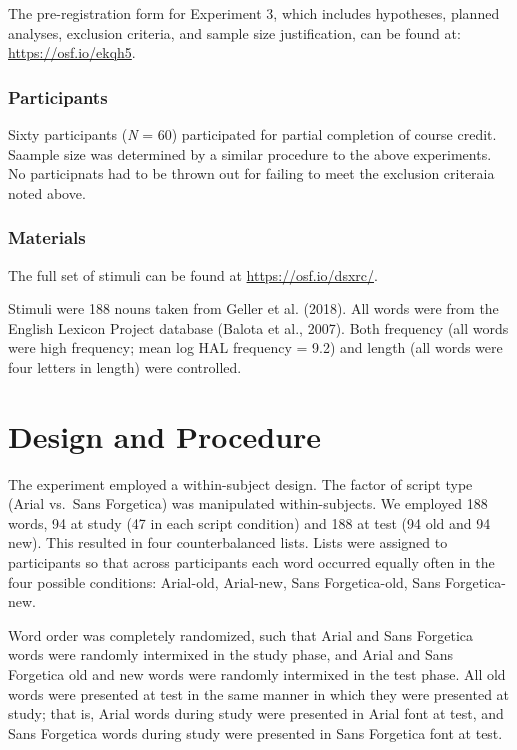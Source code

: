 \documentclass[english,doc]{apa6}
\begin{document}
The pre-registration form for Experiment 3, which includes hypotheses, planned analyses, exclusion criteria, and sample size justification, can be found at: \url{https://osf.io/ekqh5}.

\hypertarget{participants-2}{%
\subsubsection{Participants}\label{participants-2}}

Sixty participants (\emph{N} = 60) participated for partial completion of course credit. Saample size was determined by a similar procedure to the above experiments. No participnats had to be thrown out for failing to meet the exclusion criteraia noted above.

\hypertarget{materials-2}{%
\subsubsection{Materials}\label{materials-2}}

The full set of stimuli can be found at \url{https://osf.io/dsxrc/}.

Stimuli were 188 nouns taken from Geller et al. (2018). All words were from the English Lexicon Project database (Balota et al., 2007). Both frequency (all words were high frequency; mean log HAL frequency = 9.2) and length (all words were four letters in length) were controlled.

\hypertarget{design-and-procedure-2}{%
\section{Design and Procedure}\label{design-and-procedure-2}}

The experiment employed a within-subject design. The factor of script type (Arial vs.~Sans Forgetica) was manipulated within-subjects. We employed 188 words, 94 at study (47 in each script condition) and 188 at test (94 old and 94 new). This resulted in four counterbalanced lists. Lists were assigned to participants so that across participants each word occurred equally often in the four possible conditions: Arial-old, Arial-new, Sans Forgetica-old, Sans Forgetica-new.

Word order was completely randomized, such that Arial and Sans Forgetica words were randomly intermixed in the study phase, and Arial and
Sans Forgetica old and new words were randomly intermixed in the test phase. All old words were presented at test in the same manner in which they
were presented at study; that is, Arial words during study were presented in Arial font at test, and Sans Forgetica words during study were presented in Sans Forgetica font at test.
\end{document}
